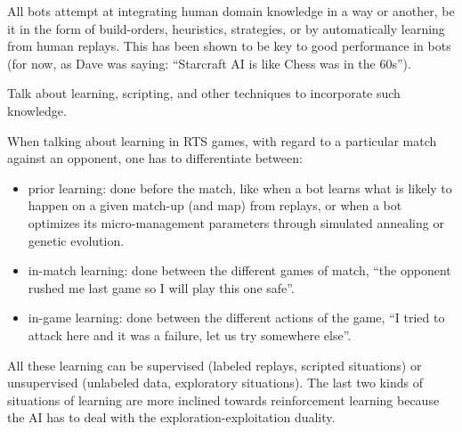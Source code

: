\documentclass[journal]{IEEEtran}
\begin{document}

{\color{blue}
All bots attempt at integrating human domain knowledge in a way or another, be it in the form of build-orders, heuristics, strategies, or by automatically learning from human replays. This has been shown to be key to good performance in bots (for now, as Dave was saying: ``Starcraft AI is like Chess was in the 60s''). 

Talk about learning, scripting, and other techniques to incorporate such knowledge.


When talking about learning in RTS games, with regard to a particular match against an opponent, one has to differentiate between:
\begin{itemize}
\item prior learning: done before the match, like when a bot learns what is likely to happen on a given match-up (and map) from replays, or when a bot optimizes its micro-management parameters through simulated annealing or genetic evolution.
\item in-match learning: done between the different games of match, ``the opponent rushed me last game so I will play this one safe''.
\item in-game learning: done between the different actions of the game, ``I tried to attack here and it was a failure, let us try somewhere else''.
\end{itemize}
All these learning can be supervised (labeled replays, scripted situations) or unsupervised (unlabeled data, exploratory situations). The last two kinds of situations of learning are more inclined towards reinforcement learning because the AI has to deal with the exploration-exploitation duality. %
}

\end{document}
